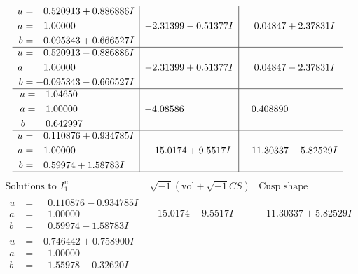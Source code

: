 \documentclass[1p]{elsarticle_modified}
\theoremstyle{definition}
\newcommand{\I}{\sqrt{-1}}
\begin{document}
$$\begin{array}{c|c|c}
\begin{aligned}
u &= \phantom{-}0.520913 + 0.886886 I \\
a &= \phantom{-}1.00000\phantom{ +0.000000I} \\
b &= -0.095343 + 0.666527 I\end{aligned}
 & -2.31399 - 0.51377 I & \phantom{-}0.04847 + 2.37831 I \\ \hline\begin{aligned}
u &= \phantom{-}0.520913 - 0.886886 I \\
a &= \phantom{-}1.00000\phantom{ +0.000000I} \\
b &= -0.095343 - 0.666527 I\end{aligned}
 & -2.31399 + 0.51377 I & \phantom{-}0.04847 - 2.37831 I \\ \hline\begin{aligned}
u &= \phantom{-}1.04650\phantom{ +0.000000I} \\
a &= \phantom{-}1.00000\phantom{ +0.000000I} \\
b &= \phantom{-}0.642997\phantom{ +0.000000I}\end{aligned}
 & -4.08586\phantom{ +0.000000I} & \phantom{-}0.408890\phantom{ +0.000000I} \\ \hline\begin{aligned}
u &= \phantom{-}0.110876 + 0.934785 I \\
a &= \phantom{-}1.00000\phantom{ +0.000000I} \\
b &= \phantom{-}0.59974 + 1.58783 I\end{aligned}
 & -15.0174 + 9.5517 I & -11.30337 - 5.82529 I\\
 \hline 
 \end{array}$$\newpage$$\begin{array}{c|c|c}  
\text{Solutions to }I^u_{1}& \I (\text{vol} + \sqrt{-1}CS) & \text{Cusp shape}\\
 \hline 
\begin{aligned}
u &= \phantom{-}0.110876 - 0.934785 I \\
a &= \phantom{-}1.00000\phantom{ +0.000000I} \\
b &= \phantom{-}0.59974 - 1.58783 I\end{aligned}
 & -15.0174 - 9.5517 I & -11.30337 + 5.82529 I \\ \hline\begin{aligned}
u &= -0.746442 + 0.758900 I \\
a &= \phantom{-}1.00000\phantom{ +0.000000I} \\
b &= \phantom{-}1.55978 - 0.32620 I\end{aligned}

\end{array}$$
\end{document}
